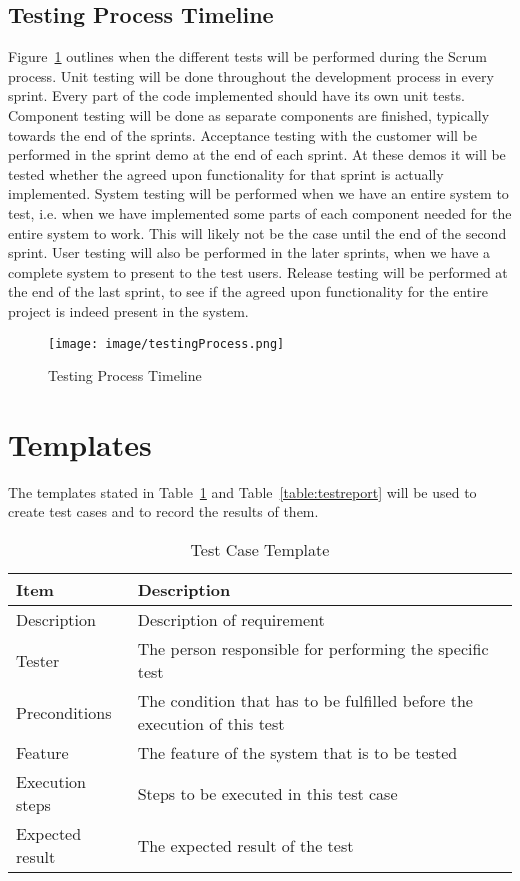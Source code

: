 \subsection{Testing Process Timeline}
Figure~\ref{figure:testOutline} outlines when the different tests will be performed during the Scrum process. Unit testing will be done throughout the development process in every sprint. Every part of the code implemented should have its own unit tests. Component testing will be done as separate components are finished, typically towards the end of the sprints. Acceptance testing with the customer will be performed in the sprint demo at the end of each sprint. At these demos it will be tested whether the agreed upon functionality for that sprint is actually implemented. System testing will be performed when we have an entire system to test, i.e. when we have implemented some parts of each component needed for the entire system to work. This will likely not be the case until the end of the second sprint. User testing will also be performed in the later sprints, when we have a complete system to present to the test users. Release testing will be performed at the end of the last sprint, to see if the agreed upon functionality for the entire project is indeed present in the system.

\begin{figure}
\centering
\texttt{[image: image/testingProcess.png]}
\caption{Testing Process Timeline}
\label{figure:testOutline}
\end{figure}

\section{Templates}
The templates stated in Table~\ref{table:testcase} and Table~\ref{table:testreport} will be used to create test cases and to record the results of them.

\begin{table}[H]
\caption{Test Case Template}
\centering
\begin{tabular}{ l l }
\hline
 Item            & Description                                                              \\
\hline
 Description     & Description of requirement                                               \\
 Tester          & The person responsible for performing the specific test                  \\
 Preconditions   & The condition that has to be fulfilled before the execution of this test \\
 Feature         & The feature of the system that is to be tested                           \\
 Execution steps & Steps to be executed in this test case                                   \\
 Expected result & The expected result of the test                                          \\
\hline
\end{tabular}
\label{table:testcase}
\end{table}

